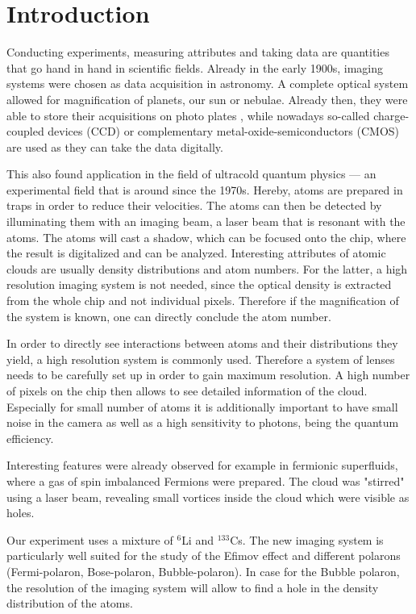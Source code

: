 \chapter{Introduction}
Conducting experiments, measuring attributes and taking data are quantities that go hand in hand in scientific fields. Already in the early 1900s, imaging systems were chosen as data acquisition in astronomy. A complete optical system allowed for magnification of planets, our sun or nebulae. Already then, they were able to store their acquisitions on photo plates \cite{hdaplates}, while nowadays so-called charge-coupled devices (CCD) or complementary metal-oxide-semiconductors (CMOS) are used as they can take the data digitally.

This also found application in the field of ultracold quantum physics --- an experimental field that is around since the 1970s. Hereby, atoms are prepared in traps in order to reduce their velocities. The atoms can then be detected by illuminating them with an imaging beam, a laser beam that is resonant with the atoms. The atoms will cast a shadow, which can be focused onto the chip, where the result is digitalized and can be analyzed. Interesting attributes of atomic clouds are usually density distributions and atom numbers. For the latter, a high resolution imaging system is not needed, since the optical density is extracted from the whole chip and not individual pixels. Therefore if the magnification of the system is known, one can directly conclude the atom number.

In order to directly see interactions between atoms and their distributions they yield, a high resolution system is commonly used. Therefore a system of lenses needs to be carefully set up in order to gain maximum resolution. A high number of pixels on the chip then allows to see detailed information of the cloud. Especially for small number of atoms it is additionally important to have small noise in the camera as well as a high sensitivity to photons, being the quantum efficiency.

Interesting features were already observed for example in fermionic superfluids, where a gas of spin imbalanced Fermions were prepared. The cloud was "stirred" using a laser beam, revealing small vortices inside the cloud which were visible as holes.

Our experiment uses a mixture of $^6$Li and $^{133}$Cs. The new imaging system is particularly well suited for the study of the Efimov effect \cite{Pires2014,Ulmanis2015,Ulmanis2016} and different polarons (Fermi-polaron, Bose-polaron, Bubble-polaron). In case for the Bubble polaron, the resolution of the imaging system will allow to find a hole in the density distribution of the atoms.

